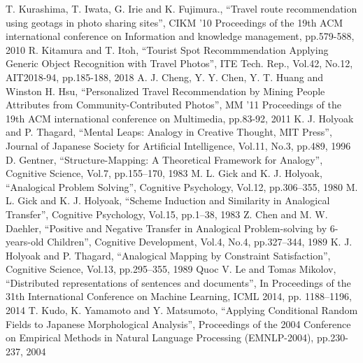 \documentclass[journal]{IAENGtran}
\begin{document}
\begin{thebibliography}{1}
    T. Kurashima, T. Iwata, G. Irie and K. Fujimura.,
      ``Travel route recommendation using geotags in photo sharing sites'',
      CIKM '10 Proceedings of the 19th ACM international conference on Information and knowledge management, pp.579-588, 2010
    R. Kitamura and T. Itoh,
      ``Tourist Spot Recommmendation Applying Generic Object Recognition with Travel Photos'',
      ITE Tech. Rep., Vol.42, No.12, AIT2018-94, pp.185-188, 2018
    A. J. Cheng, Y. Y. Chen, Y. T. Huang and Winston H. Hsu,
      ``Personalized Travel Recommendation by Mining People Attributes from Community-Contributed Photos'',
      MM '11 Proceedings of the 19th ACM international conference on Multimedia, pp.83-92, 2011
    K. J. Holyoak and P. Thagard,
      ``Mental Leaps: Analogy in Creative Thought, MIT Press'',
      Journal of Japanese Society for Artificial Intelligence,  Vol.11, No.3,  pp.489, 1996
    D. Gentner,
      ``Structure-Mapping: A Theoretical Framework for Analogy'',
      Cognitive Science, Vol.7, pp.155–170, 1983
    M. L. Gick and K. J. Holyoak,
      ``Analogical Problem Solving'',
      Cognitive Psychology, Vol.12, pp.306–355, 1980
    M. L. Gick and K. J. Holyoak,
      ``Scheme Induction and Similarity in Analogical Transfer'',
      Cognitive Psychology, Vol.15, pp.1–38, 1983
    Z. Chen and M. W. Daehler,
      ``Positive and Negative Transfer in Analogical Problem-solving by 6-years-old Children'',
      Cognitive Development, Vol.4, No.4, pp.327–344, 1989
    K. J. Holyoak and P. Thagard,
      ``Analogical Mapping by Constraint Satisfaction'',
      Cognitive Science, Vol.13, pp.295–355, 1989
    Quoc V. Le and Tomas Mikolov,
      ``Distributed representations of sentences and documents'',
      In Proceedings of the 31th International Conference on Machine Learning, ICML 2014, pp. 1188–1196, 2014
    T. Kudo, K. Yamamoto and Y. Matsumoto,
      ``Applying Conditional Random Fields to Japanese Morphological Analysis'',
      Proceedings of the 2004 Conference on Empirical Methods in Natural Language Processing (EMNLP-2004), pp.230-237, 2004

\end{thebibliography}
\end{document}
